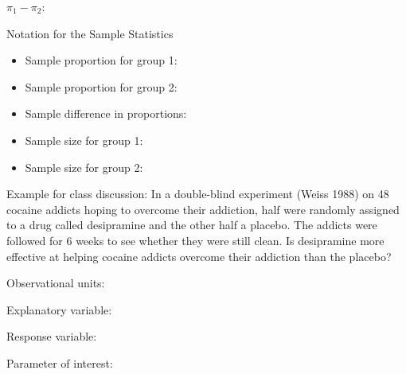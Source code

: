 \documentclass[
]{report}
\newenvironment{Shaded}{\begin{snugshade}}{\end{snugshade}}
\newcommand{\CommentTok}[1]{\textcolor[rgb]{0.56,0.35,0.01}{\textit{#1}}}
\newcommand{\FunctionTok}[1]{\textcolor[rgb]{0.13,0.29,0.53}{\textbf{#1}}}
\newcommand{\NormalTok}[1]{#1}
\newcommand{\OtherTok}[1]{\textcolor[rgb]{0.56,0.35,0.01}{#1}}
\newcommand{\SpecialCharTok}[1]{\textcolor[rgb]{0.81,0.36,0.00}{\textbf{#1}}}
\begin{document}
\(\pi_1-\pi_2:\)

\vspace{0.5in}


Notation for the Sample Statistics

\begin{itemize}
\item
  Sample proportion for group 1:
\item
  Sample proportion for group 2:
\item
  Sample difference in proportions:
\item
  Sample size for group 1:
\item
  Sample size for group 2:
\end{itemize}


Example for class discussion: In a double-blind experiment (Weiss 1988) on 48 cocaine addicts hoping to overcome their addiction, half were randomly assigned to a drug called desipramine and the other half a placebo. The addicts were followed for 6 weeks to see whether they were still clean. Is desipramine more effective at helping cocaine addicts overcome their addiction than the placebo?

Observational units:

\vspace{0.2in}

Explanatory variable:

\vspace{0.2in}

Response variable:

\vspace{0.2in}

Parameter of interest:

\vspace{0.5in}

\begin{Shaded}
\end{Shaded}
\end{document}
